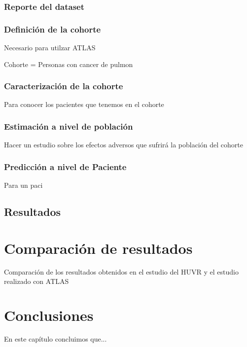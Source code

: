 \subsubsection{Reporte del dataset}

\subsubsection{Definición de la cohorte}

Necesario para utilzar ATLAS

Cohorte = Personas con cancer de pulmon

\subsubsection{Caracterización de la cohorte}

Para conocer los pacientes que tenemos en el cohorte

\subsubsection{Estimación a nivel de población}

Hacer un estudio sobre los efectos adversos que sufrirá la población del cohorte

\subsubsection{Predicción a nivel de Paciente}

Para un paci

\subsection{Resultados}


\section{Comparación de resultados}

Comparación de los resultados obtenidos en el estudio del HUVR y el estudio realizado con ATLAS


\section{Conclusiones}

En este capítulo concluimos que...